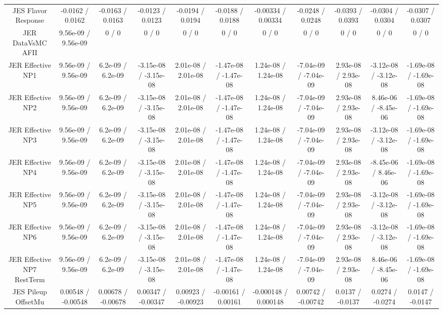 \begin{table}[htbp]
\begin{center}
\begin{tabular}{|c|c|c|c|c|c|c|c|c|c|c|}
  JES Flavor Response & -0.0162 / 0.0162 & -0.0163 / 0.0163 & -0.0123 / 0.0123 & -0.0194 / 0.0194 & -0.0188 / 0.0188 & -0.00334 / 0.00334 & -0.0248 / 0.0248 & -0.0393 / 0.0393 & -0.0304 / 0.0304 & -0.0307 / 0.0307 \\ 
  JER DataVsMC AFII & 9.56e-09 / 9.56e-09 & 0 / 0 & 0 / 0 & 0 / 0 & 0 / 0 & 0 / 0 & 0 / 0 & 0 / 0 & 0 / 0 & 0 / 0 \\ 
  JER Effective NP1 & 9.56e-09 / 9.56e-09 & 6.2e-09 / 6.2e-09 & -3.15e-08 / -3.15e-08 & 2.01e-08 / 2.01e-08 & -1.47e-08 / -1.47e-08 & 1.24e-08 / 1.24e-08 & -7.04e-09 / -7.04e-09 & 2.93e-08 / 2.93e-08 & -3.12e-08 / -3.12e-08 & -1.69e-08 / -1.69e-08 \\ 
  JER Effective NP2 & 9.56e-09 / 9.56e-09 & 6.2e-09 / 6.2e-09 & -3.15e-08 / -3.15e-08 & 2.01e-08 / 2.01e-08 & -1.47e-08 / -1.47e-08 & 1.24e-08 / 1.24e-08 & -7.04e-09 / -7.04e-09 & 2.93e-08 / 2.93e-08 & 8.46e-06 / -8.45e-06 & -1.69e-08 / -1.69e-08 \\ 
  JER Effective NP3 & 9.56e-09 / 9.56e-09 & 6.2e-09 / 6.2e-09 & -3.15e-08 / -3.15e-08 & 2.01e-08 / 2.01e-08 & -1.47e-08 / -1.47e-08 & 1.24e-08 / 1.24e-08 & -7.04e-09 / -7.04e-09 & 2.93e-08 / 2.93e-08 & -3.12e-08 / -3.12e-08 & -1.69e-08 / -1.69e-08 \\ 
  JER Effective NP4 & 9.56e-09 / 9.56e-09 & 6.2e-09 / 6.2e-09 & -3.15e-08 / -3.15e-08 & 2.01e-08 / 2.01e-08 & -1.47e-08 / -1.47e-08 & 1.24e-08 / 1.24e-08 & -7.04e-09 / -7.04e-09 & 2.93e-08 / 2.93e-08 & -8.45e-06 / 8.46e-06 & -1.69e-08 / -1.69e-08 \\ 
  JER Effective NP5 & 9.56e-09 / 9.56e-09 & 6.2e-09 / 6.2e-09 & -3.15e-08 / -3.15e-08 & 2.01e-08 / 2.01e-08 & -1.47e-08 / -1.47e-08 & 1.24e-08 / 1.24e-08 & -7.04e-09 / -7.04e-09 & 2.93e-08 / 2.93e-08 & -3.12e-08 / -3.12e-08 & -1.69e-08 / -1.69e-08 \\ 
  JER Effective NP6 & 9.56e-09 / 9.56e-09 & 6.2e-09 / 6.2e-09 & -3.15e-08 / -3.15e-08 & 2.01e-08 / 2.01e-08 & -1.47e-08 / -1.47e-08 & 1.24e-08 / 1.24e-08 & -7.04e-09 / -7.04e-09 & 2.93e-08 / 2.93e-08 & -3.12e-08 / -3.12e-08 & -1.69e-08 / -1.69e-08 \\ 
  JER Effective NP7 RestTerm & 9.56e-09 / 9.56e-09 & 6.2e-09 / 6.2e-09 & -3.15e-08 / -3.15e-08 & 2.01e-08 / 2.01e-08 & -1.47e-08 / -1.47e-08 & 1.24e-08 / 1.24e-08 & -7.04e-09 / -7.04e-09 & 2.93e-08 / 2.93e-08 & 8.46e-06 / -8.45e-06 & -1.69e-08 / -1.69e-08 \\ 
  JES Pileup OffsetMu & 0.00548 / -0.00548 & 0.00678 / -0.00678 & 0.00347 / -0.00347 & 0.00923 / -0.00923 & -0.00161 / 0.00161 & -0.000148 / 0.000148 & 0.00742 / -0.00742 & 0.0137 / -0.0137 & 0.0274 / -0.0274 & 0.0147 / -0.0147 \\ 

\end{tabular}
\end{center}
\end{table}

